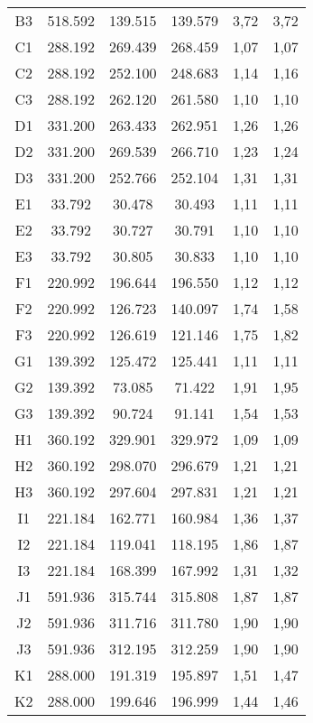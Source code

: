 \begin{center}
\begin{longtable}{cccccc}
    B3    & 518.592 & 139.515 & 139.579 & 3,72  & 3,72 \\
    C1    & 288.192 & 269.439 & 268.459 & 1,07  & 1,07 \\
    C2    & 288.192 & 252.100 & 248.683 & 1,14  & 1,16 \\
    C3    & 288.192 & 262.120 & 261.580 & 1,10  & 1,10 \\
    D1    & 331.200 & 263.433 & 262.951 & 1,26  & 1,26 \\
    D2    & 331.200 & 269.539 & 266.710 & 1,23  & 1,24 \\
    D3    & 331.200 & 252.766 & 252.104 & 1,31  & 1,31 \\
    E1    & 33.792 & 30.478 & 30.493 & 1,11  & 1,11 \\
    E2    & 33.792 & 30.727 & 30.791 & 1,10  & 1,10 \\
    E3    & 33.792 & 30.805 & 30.833 & 1,10  & 1,10 \\
    F1    & 220.992 & 196.644 & 196.550 & 1,12  & 1,12 \\
    F2    & 220.992 & 126.723 & 140.097 & 1,74  & 1,58 \\
    F3    & 220.992 & 126.619 & 121.146 & 1,75  & 1,82 \\
    G1    & 139.392 & 125.472 & 125.441 & 1,11  & 1,11 \\
    G2    & 139.392 & 73.085 & 71.422 & 1,91  & 1,95 \\
    G3    & 139.392 & 90.724 & 91.141 & 1,54  & 1,53 \\
    H1    & 360.192 & 329.901 & 329.972 & 1,09  & 1,09 \\
    H2    & 360.192 & 298.070 & 296.679 & 1,21  & 1,21 \\
    H3    & 360.192 & 297.604 & 297.831 & 1,21  & 1,21 \\
    I1    & 221.184 & 162.771 & 160.984 & 1,36  & 1,37 \\
    I2    & 221.184 & 119.041 & 118.195 & 1,86  & 1,87 \\
    I3    & 221.184 & 168.399 & 167.992 & 1,31  & 1,32 \\
    J1    & 591.936 & 315.744 & 315.808 & 1,87  & 1,87 \\
    J2    & 591.936 & 311.716 & 311.780 & 1,90  & 1,90 \\
    J3    & 591.936 & 312.195 & 312.259 & 1,90  & 1,90 \\
    K1    & 288.000 & 191.319 & 195.897 & 1,51  & 1,47 \\
    K2    & 288.000 & 199.646 & 196.999 & 1,44  & 1,46 \\

\end{longtable}
\end{center}
